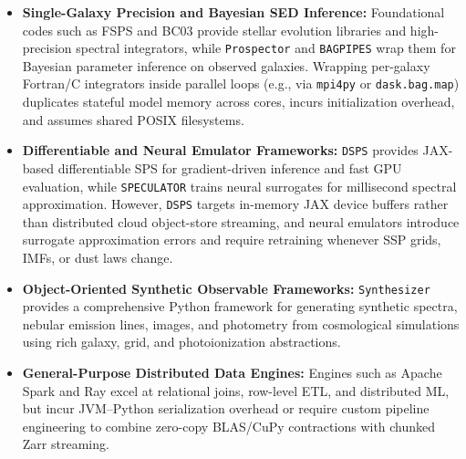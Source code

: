 \documentclass[preprint,12pt,authoryear]{elsarticle}
\begin{document}
\begin{itemize}
\item \textbf{Single-Galaxy Precision and Bayesian SED Inference:} Foundational codes such as FSPS \citep{conroy2009propagation} and BC03 \citep{bruzual2003stellar} provide stellar evolution libraries and high-precision spectral integrators, while \texttt{Prospector} \citep{johnson2021prospector} and \texttt{BAGPIPES} \citep{carnall2018bagpipes} wrap them for Bayesian parameter inference on observed galaxies. Wrapping per-galaxy Fortran/C integrators inside parallel loops (e.g., via \texttt{mpi4py} or \texttt{dask.bag.map}) duplicates stateful model memory across cores, incurs initialization overhead, and assumes shared POSIX filesystems.
\item \textbf{Differentiable and Neural Emulator Frameworks:} \texttt{DSPS} \citep{hearin2023dsps} provides JAX-based differentiable SPS for gradient-driven inference and fast GPU evaluation, while \texttt{SPECULATOR} \citep{alsing2020speculator} trains neural surrogates for millisecond spectral approximation. However, \texttt{DSPS} targets in-memory JAX device buffers rather than distributed cloud object-store streaming, and neural emulators introduce surrogate approximation errors and require retraining whenever SSP grids, IMFs, or dust laws change.
\item \textbf{Object-Oriented Synthetic Observable Frameworks:} \texttt{Synthesizer} \citep{lovell2025synthesizer,roper2026synthesizer} provides a comprehensive Python framework for generating synthetic spectra, nebular emission lines, images, and photometry from cosmological simulations using rich galaxy, grid, and photoionization abstractions.
\item \textbf{General-Purpose Distributed Data Engines:} Engines such as Apache Spark \citep{zaharia2016apache} and Ray \citep{moritz2018ray} excel at relational joins, row-level ETL, and distributed ML, but incur JVM--Python serialization overhead or require custom pipeline engineering to combine zero-copy BLAS/CuPy contractions with chunked Zarr streaming.
\end{itemize}
\end{document}
